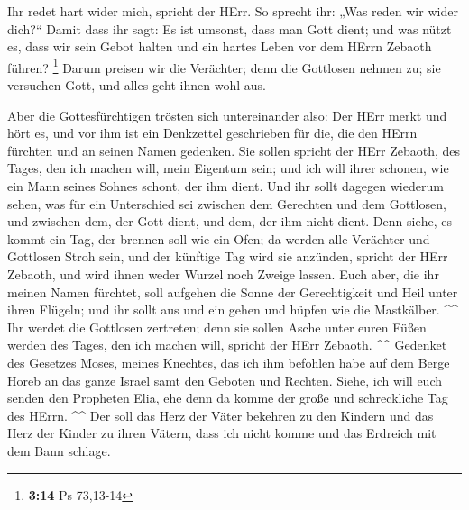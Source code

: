  Ihr redet hart wider mich, spricht der HErr. So sprecht
ihr: „Was reden wir wider dich?{}``  Damit dass ihr sagt:
Es ist umsonst, dass man Gott dient; und was nützt es, dass wir sein
Gebot halten und ein hartes Leben vor dem HErrn Zebaoth führen?
\footnote{\textbf{3:14} Ps 73,13-14}  Darum preisen wir
die Verächter; denn die Gottlosen nehmen zu; sie versuchen Gott, und
alles geht ihnen wohl aus.

 Aber die Gottesfürchtigen trösten sich untereinander
also: Der HErr merkt und hört es, und vor ihm ist ein Denkzettel
geschrieben für die, die den HErrn fürchten und an seinen Namen
gedenken.  Sie sollen spricht der HErr Zebaoth, des
Tages, den ich machen will, mein Eigentum sein; und ich will ihrer
schonen, wie ein Mann seines Sohnes schont, der ihm dient.
 Und ihr sollt dagegen wiederum sehen, was für ein
Unterschied sei zwischen dem Gerechten und dem Gottlosen, und zwischen
dem, der Gott dient, und dem, der ihm nicht dient.  Denn
siehe, es kommt ein Tag, der brennen soll wie ein Ofen; da werden alle
Verächter und Gottlosen Stroh sein, und der künftige Tag wird sie
anzünden, spricht der HErr Zebaoth, und wird ihnen weder Wurzel noch
Zweige lassen.  Euch aber, die ihr meinen Namen fürchtet,
soll aufgehen die Sonne der Gerechtigkeit und Heil unter ihren Flügeln;
und ihr sollt aus und ein gehen und hüpfen wie die Mastkälber. \^{}\^{}
 Ihr werdet die Gottlosen zertreten; denn sie sollen
Asche unter euren Füßen werden des Tages, den ich machen will, spricht
der HErr Zebaoth. \^{}\^{}  Gedenket des Gesetzes Moses,
meines Knechtes, das ich ihm befohlen habe auf dem Berge Horeb an das
ganze Israel samt den Geboten und Rechten.  Siehe, ich
will euch senden den Propheten Elia, ehe denn da komme der große und
schreckliche Tag des HErrn. \^{}\^{}  Der soll das Herz
der Väter bekehren zu den Kindern und das Herz der Kinder zu ihren
Vätern, dass ich nicht komme und das Erdreich mit dem Bann schlage.
